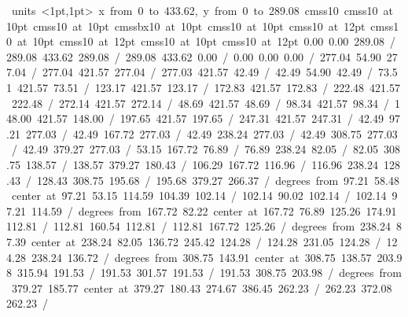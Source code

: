 \hbox{\beginpicture
\setcoordinatesystem units <1pt,1pt>
\setplotarea x from 0 to 433.62, y from 0 to 289.08
\setlinear
\font\picfont cmss10\picfont
\font\picfont cmss10 at 10pt\picfont
\font\picfont cmss10 at 10pt\picfont
\font\picfont cmssbx10 at 10pt\picfont
\font\picfont cmss10 at 10pt\picfont
\font\picfont cmss10 at 12pt\picfont
\font\picfont cmss10 at 10pt\picfont
\font\picfont cmss10 at 12pt\picfont
\font\picfont cmss10 at 10pt\picfont
\font\picfont cmss10 at 12pt\picfont
\setsolid
{} 0.00 0.00 289.08 /
 289.08 433.62 289.08 /
 289.08 433.62 0.00 /
 0.00 0.00 0.00 /
\setsolid
{} 277.04 54.90 277.04 /
 277.04 421.57 277.04 /
 277.03 421.57 42.49 /
 42.49 54.90 42.49 /
\setsolid
{} 73.51 421.57 73.51 /
\setsolid
{} 123.17 421.57 123.17 /
\setsolid
{} 172.83 421.57 172.83 /
\setsolid
{} 222.48 421.57 222.48 /
\setsolid
{} 272.14 421.57 272.14 /
\setsolid
{} 48.69 421.57 48.69 /
\setsolid
{} 98.34 421.57 98.34 /
\setsolid
{} 148.00 421.57 148.00 /
\setsolid
{} 197.65 421.57 197.65 /
\setsolid
{} 247.31 421.57 247.31 /
\setsolid
{} 42.49 97.21 277.03 /
\setsolid
{} 42.49 167.72 277.03 /
\setsolid
{} 42.49 238.24 277.03 /
\setsolid
{} 42.49 308.75 277.03 /
\setsolid
{} 42.49 379.27 277.03 /
\setsolid
{} 53.15 167.72 76.89 /
 76.89 238.24 82.05 /
 82.05 308.75 138.57 /
 138.57 379.27 180.43 /
\setsolid
{} 106.29 167.72 116.96 /
 116.96 238.24 128.43 /
 128.43 308.75 195.68 /
 195.68 379.27 266.37 /
 degrees from 97.21 58.48 center at 97.21 53.15
\setsolid
{} 114.59 104.39 102.14 /
 102.14 90.02 102.14 /
 102.14 97.21 114.59 /
 degrees from 167.72 82.22 center at 167.72 76.89
\setsolid
{} 125.26 174.91 112.81 /
 112.81 160.54 112.81 /
 112.81 167.72 125.26 /
 degrees from 238.24 87.39 center at 238.24 82.05
\setsolid
{} 136.72 245.42 124.28 /
 124.28 231.05 124.28 /
 124.28 238.24 136.72 /
 degrees from 308.75 143.91 center at 308.75 138.57
\setsolid
{} 203.98 315.94 191.53 /
 191.53 301.57 191.53 /
 191.53 308.75 203.98 /
 degrees from 379.27 185.77 center at 379.27 180.43
\setsolid
{} 274.67 386.45 262.23 /
 262.23 372.08 262.23 /
}
